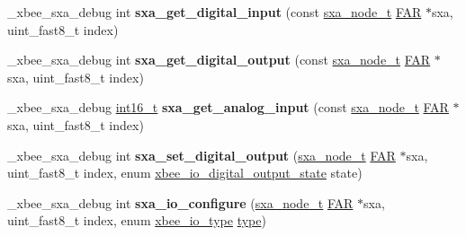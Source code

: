 \begin{DoxyCompactItemize}
\item 
\mbox{\label{group___s_x_a_gadfbf4b01e49eee344a444f643bd00eab}} 
\+\_\+xbee\+\_\+sxa\+\_\+debug int {\bfseries sxa\+\_\+get\+\_\+digital\+\_\+input} (const \hyperlink{structsxa__node__t}{sxa\+\_\+node\+\_\+t} \hyperlink{group__hal_gaef060b3456fdcc093a7210a762d5f2ed}{F\+AR} $\ast$sxa, uint\+\_\+fast8\+\_\+t index)
\item 
\mbox{\label{group___s_x_a_ga6a9905fa096110df102ea073aa021914}} 
\+\_\+xbee\+\_\+sxa\+\_\+debug int {\bfseries sxa\+\_\+get\+\_\+digital\+\_\+output} (const \hyperlink{structsxa__node__t}{sxa\+\_\+node\+\_\+t} \hyperlink{group__hal_gaef060b3456fdcc093a7210a762d5f2ed}{F\+AR} $\ast$sxa, uint\+\_\+fast8\+\_\+t index)
\item 
\mbox{\label{group___s_x_a_ga1687997b92d82244cf50cf8dbc311aa6}} 
\+\_\+xbee\+\_\+sxa\+\_\+debug \hyperlink{group__hal__dos_ga2140805d08462d474b82ddc8d1c2f3e6}{int16\+\_\+t} {\bfseries sxa\+\_\+get\+\_\+analog\+\_\+input} (const \hyperlink{structsxa__node__t}{sxa\+\_\+node\+\_\+t} \hyperlink{group__hal_gaef060b3456fdcc093a7210a762d5f2ed}{F\+AR} $\ast$sxa, uint\+\_\+fast8\+\_\+t index)
\item 
\mbox{\label{group___s_x_a_ga5479fd816024530e822d6191357d8d79}} 
\+\_\+xbee\+\_\+sxa\+\_\+debug int {\bfseries sxa\+\_\+set\+\_\+digital\+\_\+output} (\hyperlink{structsxa__node__t}{sxa\+\_\+node\+\_\+t} \hyperlink{group__hal_gaef060b3456fdcc093a7210a762d5f2ed}{F\+AR} $\ast$sxa, uint\+\_\+fast8\+\_\+t index, enum \hyperlink{group__xbee__io_gaf104a10d2bc34550b99de92fe3564cd2}{xbee\+\_\+io\+\_\+digital\+\_\+output\+\_\+state} state)
\item 
\mbox{\label{group___s_x_a_gaeedb9e47f6ee8470ebae15440a9343f1}} 
\+\_\+xbee\+\_\+sxa\+\_\+debug int {\bfseries sxa\+\_\+io\+\_\+configure} (\hyperlink{structsxa__node__t}{sxa\+\_\+node\+\_\+t} \hyperlink{group__hal_gaef060b3456fdcc093a7210a762d5f2ed}{F\+AR} $\ast$sxa, uint\+\_\+fast8\+\_\+t index, enum \hyperlink{group__xbee__io_gac23a55c53310f865d9ed2381e331a438}{xbee\+\_\+io\+\_\+type} \hyperlink{group__zcl_ga1d127017fb298b889f4ba24752d08b8e}{type})
\item 
\mbox{\label{group___s_x_a_gab8bd3f38d1a7cb4497e1d037d9e3e7dc}} 

\end{DoxyCompactItemize}
